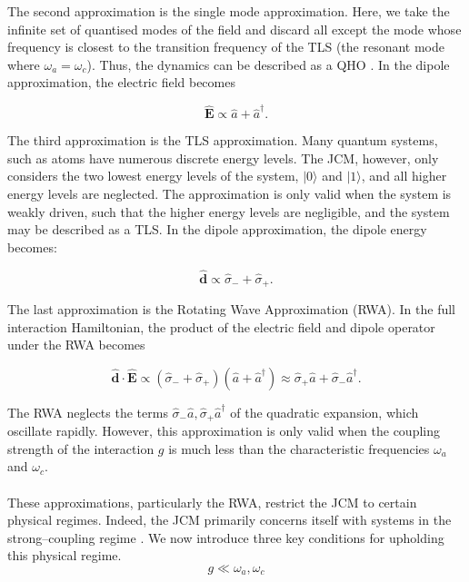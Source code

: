 \documentclass[11pt]{article}
\begin{document}
The second approximation is the single mode approximation. Here, we take the infinite set of quantised modes of the field and discard all except the mode whose frequency is closest to the transition frequency of the TLS (the resonant mode where $\omega_a = \omega_c$). Thus, the dynamics can be described as a QHO \cite{General2024-JCM_relevance}. In the dipole approximation, the electric field becomes

\begin{equation*}
    \boldsymbol{\hat{E}}  \propto \hat{a} + \hat{a}^\dagger.
\end{equation*}


The third approximation is the TLS approximation. Many quantum systems, such as atoms have numerous discrete energy levels. The JCM, however, only considers the two lowest energy levels of the system, $|0\rangle$ and $|1\rangle$, and all higher energy levels are neglected. The approximation is only valid when the system is weakly driven, such that the higher energy levels are negligible, and the system may be described as a TLS. In the dipole approximation, the dipole energy becomes:

\begin{equation*}
    \boldsymbol{\hat{d}}  \propto \hat{\sigma}_{-} + \hat{\sigma}_{+}.
\end{equation*}

The last approximation is the Rotating Wave Approximation (RWA). In the full interaction Hamiltonian, the product of the electric field and dipole operator under the RWA becomes

\begin{equation}
    \boldsymbol{\hat{d}} \cdot \boldsymbol{\hat{E}} \propto (\hat{\sigma}_{-} + \hat{\sigma}_{+})(\hat{a} + \hat{a}^\dagger) \approx \hat{\sigma}_{+}\hat{a} +\hat{\sigma}_{-}\hat{a}^\dagger. 
\end{equation}

The RWA neglects the terms $\hat{\sigma}_{-}\hat{a}, \hat{\sigma}_{+}\hat{a}^\dagger$ of the quadratic expansion, which oscillate rapidly. However, this approximation is only valid when the coupling strength of the interaction $g$ is much less than the characteristic frequencies $\omega_a$ and $\omega_c$. \\
\\
These approximations, particularly the RWA, restrict the JCM to certain physical regimes. Indeed, the JCM primarily concerns itself with systems in the strong--coupling regime \cite{General2024-JCM_relevance}. We now introduce three key conditions for upholding this physical regime.
\begin{equation} \label{JCM_condition_g<omega}
    g \ll \omega_a, \omega_c 
\end{equation} 
\end{document}
